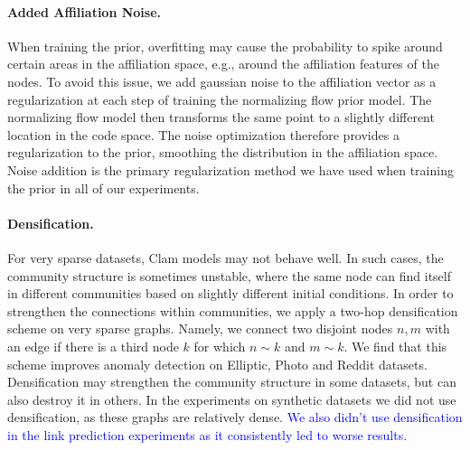 \documentclass{article}
\theoremstyle{plain}
\theoremstyle{definition}
\theoremstyle{remark}
\newcommand{\ron}[1]{{{\textcolor{red}{\textbf{[Ron:} {#1}\textbf{]}}}}}
\newcommand{\dan}[1]{{{\textcolor{blue}{ {#1}\textbf{}}}}}
\begin{document}
\paragraph{Added Affiliation Noise.}
When training the prior, overfitting may cause the probability to spike around certain areas in the affiliation space, e.g., around the affiliation features of the nodes. To avoid this issue, we add gaussian noise to the affiliation vector as a regularization at each step of training the normalizing flow prior model. The normalizing flow model then transforms the same point to a slightly different location in the code space. The noise optimization therefore provides a regularization to the prior, smoothing the distribution in the affiliation space.  Noise addition is the primary regularization method we have used when training the prior in all of our experiments.




\paragraph{Densification.}
\label{sec: densification definition}
For very sparse datasets, Clam models may not behave well. In such cases, the community structure is sometimes unstable, where the same node can find itself in different communities based on slightly different initial conditions. In order to strengthen the connections within communities, we apply a two-hop densification scheme on very sparse graphs. Namely, we connect two disjoint nodes $n,m$ with an edge if there is a third node $k$ for which $n \sim k$ and $m\sim k$. We find that this scheme improves anomaly detection on Elliptic, Photo and Reddit datasets. 
Densification may strengthen the community structure in some datasets, but can also destroy it in others. In the experiments on synthetic datasets we did not use densification, as these graphs are relatively dense. \dan{We also didn't use densification in the link prediction experiments as it consistently led to worse results.}
\end{document}
